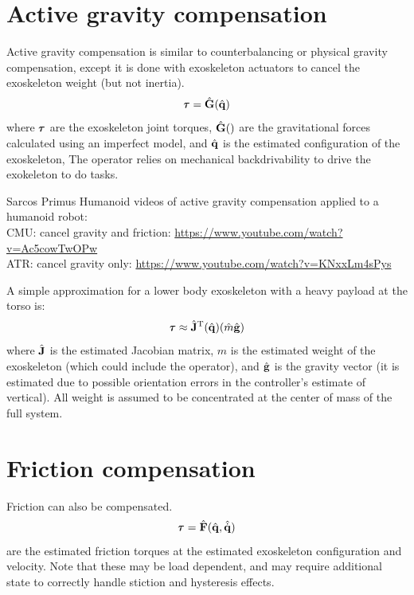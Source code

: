 \documentclass[letterpaper,12pt,fullpage]{article}
\begin{document}
\section{Active gravity compensation}

Active gravity compensation is similar 
to counterbalancing or physical gravity compensation, except it is done
with exoskeleton actuators to cancel the exoskeleton weight (but not inertia).
\begin{equation}
\vtau = \hat{\mG}(\hat{\vq})
\end{equation}
where $\vtau$ are the exoskeleton joint torques, 
$\hat{{\bf G}}()$ are the gravitational forces calculated using an imperfect model, 
and $\hat{{\bf q}}$ is the estimated configuration of the exoskeleton,
The operator relies on mechanical backdrivability to drive
the exokeleton to do tasks.

Sarcos Primus Humanoid videos of active gravity compensation applied
to a humanoid robot:\\
CMU: cancel gravity and friction: \url{https://www.youtube.com/watch?v=Ac5cowTwOPw}\\
ATR: cancel gravity only: \url{https://www.youtube.com/watch?v=KNxxLm4sPys}

A simple approximation for a lower body exoskeleton with a heavy payload at the
torso is:
\begin{equation}
\vtau \approx \hat{\mJ}^{\tr}(\hat{\vq}) (\hat{m} \hat{\vg})
\end{equation}
where $\hat{{\bf J}}$ is the estimated Jacobian matrix,
$\hat{m}$ is the estimated
weight of the exoskeleton (which could include the operator),
and $\hat{{\bf g}}$ is the gravity vector (it is estimated due to possible orientation
errors in the controller's estimate of vertical).
All weight is assumed to be concentrated at the center of mass of the full system.

\section{Friction compensation}

Friction can also be compensated.
\begin{equation}
\vtau = \hat{\mF}(\hat{\vq},\hat{\dot{\vq}}) 
\end{equation}
are the estimated friction torques at the estimated exoskeleton configuration
and velocity.
Note that these may be load dependent, and may require additional state to
correctly handle stiction and hysteresis effects.
\end{document}
